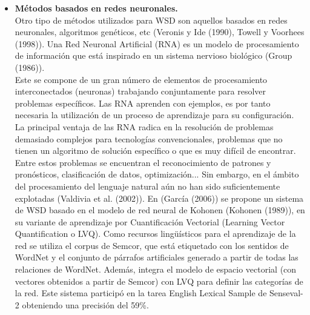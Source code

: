 \begin{itemize}
  \item \textbf{Métodos basados en redes neuronales.} \\
  Otro tipo de métodos utilizados para WSD son aquellos basados en redes neuronales, algoritmos genéticos, etc (Veronis y Ide (1990), Towell y Voorhees (1998)). Una Red Neuronal Artificial (RNA) es un modelo de procesamiento de información que está inspirado en un sistema nervioso biológico (Group (1986)).\\
  Este se compone de un gran número de elementos de procesamiento interconectados (neuronas) trabajando conjuntamente para resolver problemas específicos. Las RNA aprenden con ejemplos, es por tanto necesaria la utilización de un proceso de aprendizaje para su configuración. La principal ventaja de las RNA radica en la resolución de problemas demasiado complejos para tecnologías convencionales, problemas que no tienen un algoritmo de solución específico o que es muy difícil de encontrar. Entre estos problemas se encuentran el reconocimiento de patrones y pronósticos, clasificación de datos, optimización... Sin embargo, en el ámbito del procesamiento del lenguaje natural aún no han sido suficientemente explotadas (Valdivia et al. (2002)). En (García (2006)) se propone un sistema de WSD basado en el modelo de red neural de Kohonen (Kohonen (1989)), en su variante de aprendizaje por Cuantificación Vectorial (Learning Vector Quantification o LVQ). Como recursos lingüísticos para el aprendizaje de la red se utiliza el corpus de Semcor, que está etiquetado con los sentidos de WordNet y el conjunto de párrafos artificiales generado a partir de todas las relaciones de WordNet. Además, integra el modelo de espacio vectorial (con vectores obtenidos a partir de Semcor) con LVQ para definir las categorías de la red. Este sistema participó en la tarea English Lexical Sample de Senseval-2 obteniendo una precisión del 59\%.

\end{itemize}

